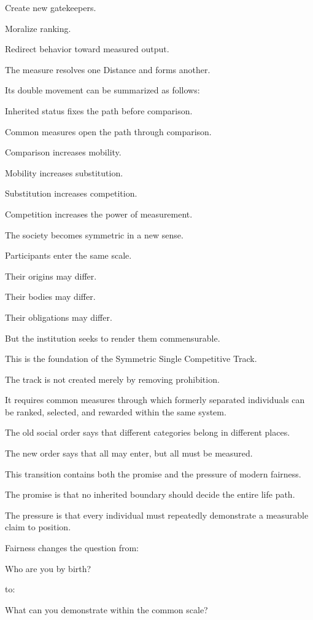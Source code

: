 Create new gatekeepers.

Moralize ranking.

Redirect behavior toward measured output.

The measure resolves one Distance and forms another.

Its double movement can be summarized as follows:

Inherited status fixes the path before comparison.

Common measures open the path through comparison.

Comparison increases mobility.

Mobility increases substitution.

Substitution increases competition.

Competition increases the power of measurement.

The society becomes symmetric in a new sense.

Participants enter the same scale.

Their origins may differ.

Their bodies may differ.

Their obligations may differ.

But the institution seeks to render them commensurable.

This is the foundation of the Symmetric Single Competitive Track.

The track is not created merely by removing prohibition.

It requires common measures through which formerly separated individuals can be ranked, selected, and rewarded within the same system.

The old social order says that different categories belong in different places.

The new order says that all may enter, but all must be measured.

This transition contains both the promise and the pressure of modern fairness.

The promise is that no inherited boundary should decide the entire life path.

The pressure is that every individual must repeatedly demonstrate a measurable claim to position.

Fairness changes the question from:

Who are you by birth?

to:

What can you demonstrate within the common scale?

